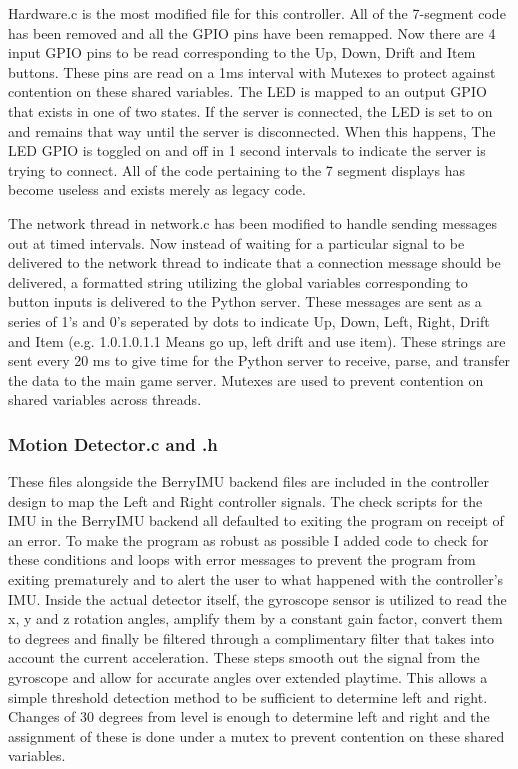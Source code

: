 \documentclass[a4paper,10pt]{article}
\begin{document}
Hardware.c is the most modified file for this controller. All of the 7-segment code has been removed and all the GPIO pins have been remapped. Now there are 4 input GPIO pins to be read corresponding to the Up, Down, Drift and Item buttons. These pins are read on a 1ms interval with Mutexes to protect against contention on these shared variables. The LED is mapped to an output GPIO that exists in one of two states. If the server is connected, the LED is set to on and remains that way until the server is disconnected. When this happens, The LED GPIO is toggled on and off in 1 second intervals to indicate the server is trying to connect. All of the code pertaining to the 7 segment displays has become useless and exists merely as legacy code. 

The network thread in network.c has been modified to handle sending messages out at timed intervals. Now instead of waiting for a particular signal to be delivered to the network thread to indicate that a connection message should be delivered, a formatted string utilizing the global variables corresponding to button inputs is delivered to the Python server. These messages are sent as a series of 1's and 0's seperated by dots to indicate Up, Down, Left, Right, Drift and Item (e.g. 1.0.1.0.1.1 Means go up, left drift and use item). These strings are sent every 20 ms to give time for the Python server to receive, parse, and transfer the data to the main game server. Mutexes are used to prevent contention on shared variables across threads.

\subsubsection{Motion Detector.c and .h}
These files alongside the BerryIMU backend files are included in the controller design to map the Left and Right controller signals. The check scripts for the IMU in the BerryIMU backend all defaulted to exiting the program on receipt of an error. To make the program as robust as possible I added code to check for these conditions and loops with error messages to prevent the program from exiting prematurely and to alert the user to what happened with the controller's IMU. Inside the actual detector itself, the gyroscope sensor is utilized to read the x, y and z rotation angles, amplify them by a constant gain factor, convert them to degrees and finally be filtered through a complimentary filter that takes into account the current acceleration. These steps smooth out the signal from the gyroscope and allow for accurate angles over extended playtime. This allows a simple threshold detection method to be sufficient to determine left and right. Changes of 30 degrees from level is enough to determine left and right and the assignment of these is done under a mutex to prevent contention on these shared variables.
\end{document}
